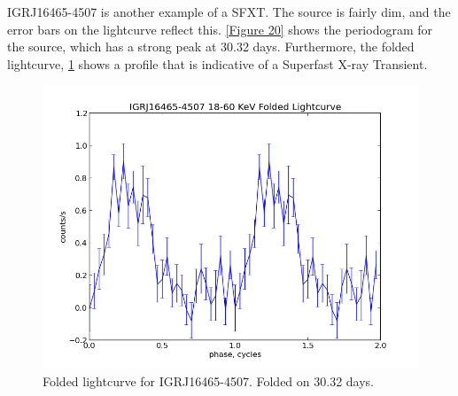 IGRJ16465-4507 is another example of a SFXT. The source is fairly dim, and the error bars on the lightcurve reflect this. \ref{Figure 20} shows the periodogram for the source, which has a strong peak at 30.32 days. Furthermore, the folded lightcurve, \ref{Figure 21} shows a profile that is indicative of a Superfast X-ray Transient. 

\begin{figure}[h!]
\centering
\includegraphics[width=130mm]{gfx/Figure21.png}
\caption{Folded lightcurve for IGRJ16465-4507. Folded on 30.32 days.}
\label{Figure 21}
\end{figure} 





